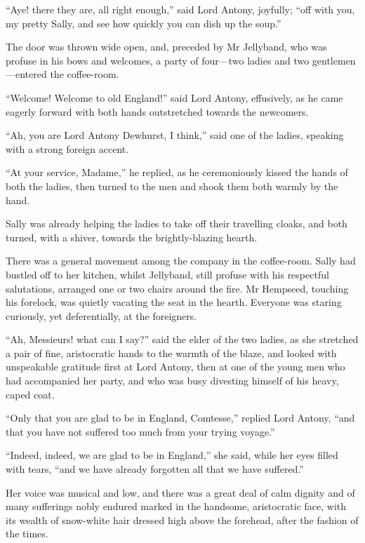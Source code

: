 \enquote{Aye! there they are, all right enough,} said Lord Antony, joyfully; \enquote{off with you, my pretty Sally, and see how quickly you can dish up the soup.}

The door was thrown wide open, and, preceded by Mr Jellyband, who was profuse in his bows and welcomes, a party of four---two ladies and two gentlemen---entered the coffee-room.

\enquote{Welcome! Welcome to old England!} said Lord Antony, effusively, as he came eagerly forward with both hands outstretched towards the newcomers.

\enquote{Ah, you are Lord Antony Dewhurst, I think,} said one of the ladies, speaking with a strong foreign accent.

\enquote{At your service, Madame,} he replied, as he ceremoniously kissed the hands of both the ladies, then turned to the men and shook them both warmly by the hand.

Sally was already helping the ladies to take off their travelling cloaks, and both turned, with a shiver, towards the brightly-blazing hearth.

There was a general movement among the company in the coffee-room. Sally had bustled off to her kitchen, whilst Jellyband, still profuse with his respectful salutations, arranged one or two chairs around the fire. Mr Hempseed, touching his forelock, was quietly vacating the seat in the hearth. Everyone was staring curiously, yet deferentially, at the foreigners.

\enquote{Ah, Messieurs! what can I say?} said the elder of the two ladies, as she stretched a pair of fine, aristocratic hands to the warmth of the blaze, and looked with unspeakable gratitude first at Lord Antony, then at one of the young men who had accompanied her party, and who was busy divesting himself of his heavy, caped coat.

\enquote{Only that you are glad to be in England, Comtesse,} replied Lord Antony, \enquote{and that you have not suffered too much from your trying voyage.}

\enquote{Indeed, indeed, we are glad to be in England,} she said, while her eyes filled with tears, \enquote{and we have already forgotten all that we have suffered.}

Her voice was musical and low, and there was a great deal of calm dignity and of many sufferings nobly endured marked in the handsome, aristocratic face, with its wealth of snow-white hair dressed high above the forehead, after the fashion of the times.

